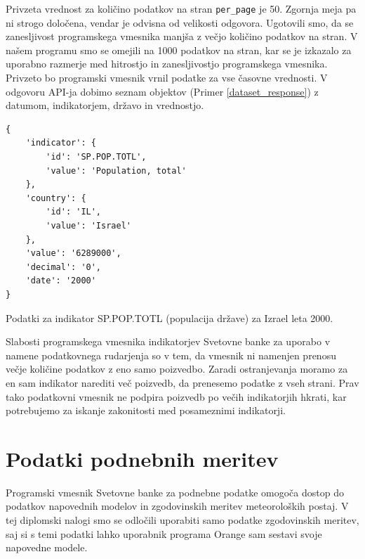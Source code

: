 
Privzeta vrednost za količino podatkov na stran \verb|per_page| je 50. 
Zgornja meja pa ni strogo določena, vendar je odvisna od velikosti odgovora. 
Ugotovili smo, da se zanesljivost programskega vmesnika manjša z večjo 
količino podatkov na stran. V našem programu smo se omejili na 1000 podatkov
na stran, kar se je izkazalo za uporabno razmerje med hitrostjo in 
zanesljivostjo programskega vmesnika. Privzeto bo programski vmesnik vrnil 
podatke za vse časovne vrednosti. V odgovoru API-ja dobimo seznam objektov 
(Primer \ref{dataset_response}) z datumom, indikatorjem, državo in vrednostjo.

\begin{snippet}
\begin{center}
\begin{lstlisting}
{
    'indicator': {
        'id': 'SP.POP.TOTL',
        'value': 'Population, total'
    },
    'country': {
        'id': 'IL',
        'value': 'Israel'
    },
    'value': '6289000',
    'decimal': '0',
    'date': '2000'
}
\end{lstlisting}
\end{center}
\caption{Podatki za indikator SP.POP.TOTL (populacija države) za Izrael leta
2000.}
\label{dataset_response}
\end{snippet} 

Slabosti programskega vmesnika indikatorjev Svetovne banke za uporabo v namene
podatkovnega rudarjenja so v tem, da vmesnik ni namenjen prenosu večje 
količine podatkov z eno samo poizvedbo. Zaradi ostranjevanja moramo za en sam 
indikator narediti več poizvedb, da prenesemo podatke z vseh strani. Prav 
tako podatkovni vmesnik ne podpira poizvedb po večih indikatorjih hkrati, kar
potrebujemo za iskanje zakonitosti med posameznimi indikatorji.

\section{Podatki podnebnih meritev}

Programski vmesnik Svetovne banke za podnebne podatke omogoča dostop do 
podatkov napovednih modelov in zgodovinskih meritev meteoroloških postaj. V tej 
diplomski nalogi smo se odločili uporabiti samo podatke zgodovinskih meritev, 
saj si s temi podatki lahko uporabnik programa Orange sam sestavi svoje 
napovedne modele.


